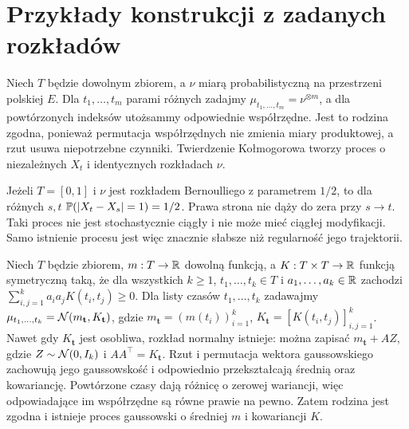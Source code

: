 \section{Przykłady konstrukcji z zadanych rozkładów}
\begin{przyklad}
Niech $T$ będzie dowolnym zbiorem, a $\nu$ miarą
probabilistyczną na przestrzeni polskiej $E$.
Dla $t_1,\ldots,t_m$ parami różnych zadajmy
$\mu_{t_1,\ldots,t_m}=\nu^{\otimes m}$,
a dla powtórzonych indeksów utożsammy odpowiednie
współrzędne. Jest to rodzina zgodna, ponieważ
permutacja współrzędnych nie zmienia miary produktowej,
a rzut usuwa niepotrzebne czynniki.
Twierdzenie Kołmogorowa tworzy proces o niezależnych
$X_t$ i identycznych rozkładach $\nu$.

Jeżeli $T=[0,1]$ i $\nu$ jest rozkładem Bernoulliego z
parametrem $1/2$, to dla różnych $s,t$
$\mathbb{P}(|X_t-X_s|=1)=1/2$. Prawa strona nie dąży do
zera przy $s\to t$. Taki proces nie jest stochastycznie
ciągły i nie może mieć ciągłej modyfikacji. Samo
istnienie procesu jest więc znacznie słabsze niż
regularność jego trajektorii.
\end{przyklad}

\begin{przyklad}
Niech $T$ będzie zbiorem, $m:T\to\mathbb{R}$ dowolną funkcją,
a $K:T\times T\to\mathbb{R}$ funkcją symetryczną taką, że
dla wszystkich $k\ge1$, $t_1,\ldots,t_k\in T$
i $a_1,\ldots,a_k\in\mathbb{R}$ zachodzi
$\sum_{i,j=1}^k a_ia_jK(t_i,t_j)\ge0$.
Dla listy czasów $t_1,\ldots,t_k$ zadawajmy
$\mu_{t_1,\ldots,t_k}=\mathcal{N}(m_{\mathbf t},K_{\mathbf t})$,
gdzie $m_{\mathbf t}=(m(t_i))_{i=1}^k$,
$K_{\mathbf t}=[K(t_i,t_j)]_{i,j=1}^k$.
Nawet gdy $K_{\mathbf t}$ jest osobliwa, rozkład normalny
istnieje: można zapisać $m_{\mathbf t}+AZ$, gdzie
$Z\sim\mathcal{N}(0,I_k)$ i $AA^\top=K_{\mathbf t}$.
Rzut i permutacja wektora gaussowskiego zachowują jego
gaussowskość i odpowiednio przekształcają średnią
oraz kowariancję. Powtórzone czasy dają różnicę o
zerowej wariancji, więc odpowiadające im współrzędne
są równe prawie na pewno. Zatem rodzina jest zgodna
i istnieje proces gaussowski o średniej $m$ i kowariancji $K$.
\end{przyklad}


